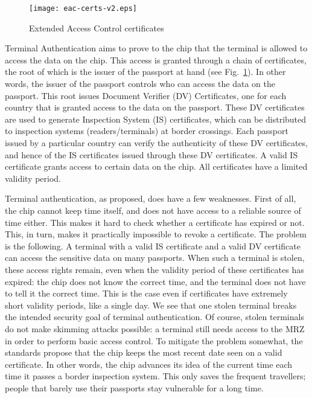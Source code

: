 \documentclass[runningheads,envcountsame,envcountsect,oribibl]{llncs}
\begin{document}
\begin{figure}[t]
\begin{center}
\texttt{[image: eac-certs-v2.eps]}
\end{center} 
\caption{Extended Access Control certificates}
\label{fig-certs}
\end{figure}


Terminal Authentication aims to prove to the chip that the terminal is allowed
to access the data on the chip. This access is granted through a chain of
certificates, the root of which is the issuer of the passport at hand
(see Fig.~\ref{fig-certs}). In other words, the issuer of the passport
controls who can access the data on the passport.
This root issues Document Verifier (DV) Certificates, one for each country that is
granted access to the data on the passport. These DV certificates
are used to generate Inspection System (IS) certificates, which can be
distributed to inspection systems (\eg readers/terminals) at border crossings. 
Each passport issued by a particular country can verify the authenticity of
these DV certificates, and hence of the IS certificates issued through
these DV certificates. A valid IS certificate grants access to certain data on
the chip. All certificates have a limited validity period.

Terminal authentication, as proposed, does have a few weaknesses. 
First of all, the chip cannot keep time itself, and does not have access
to a reliable source of time either. This makes it hard to check whether a
certificate has expired or not. This, in turn, makes it practically impossible
to revoke a certificate. The problem is the following. A terminal with a valid
IS certificate and a valid DV certificate can access the sensitive data on 
many passports. When such a terminal is stolen, these access rights remain,
even when the validity period of these certificates has expired: the chip does
not know the correct time, and the terminal does not have to tell it the
correct time. This is the case even if certificates have extremely short
validity periods, like a single day. 
We see that one stolen terminal breaks the intended security goal of 
terminal authentication. Of course, stolen terminals do not make skimming
attacks possible: a terminal still needs access to the MRZ in order to 
perform basic access control. To mitigate the problem somewhat, the standards
propose that the chip keeps the most recent date seen on a valid
certificate. In other words, the chip advances its idea of the current time
each time it passes a border inspection system. This only saves the frequent
travellers; people that barely use their passports stay vulnerable for a long
time. 
\end{document}
